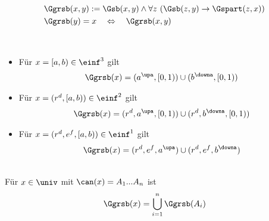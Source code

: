 
\begin{erin}
    \begin{align*}
        &\Ggrsb(x,y) := \Gsb(x,y) \wedge \forall z\ (\Gsb(z,y) \to \Gspart(z,x))\\
        &\Ggrsb(y) = x \quad \Leftrightarrow \quad \Ggrsb(x,y)
    \end{align*}
\end{erin}

\begin{hyp}\ 
    \begin{itemize}
        \item Für $x = [a,b) \in \einf^3$ gilt
            \begin{align*}
                \Ggrsb(x) = (a^\upa, [0,1)) \cup (b^\downa, [0,1))
            \end{align*}
        \item Für $x = (r^d,[a,b)) \in \einf^2$ gilt
            \begin{align*}
                \Ggrsb(x) = (r^d, a^\upa, [0,1)) \cup (r^d, b^\downa, [0,1))
            \end{align*}
        \item Für $x = (r^d,e^f,[a,b)) \in \einf^1$ gilt
            \begin{align*}
                \Ggrsb(x) = (r^d,e^f, a^\upa) \cup (r^d, e^f, b^\downa)
            \end{align*}
    \end{itemize}
\end{hyp}

\begin{hyp}\ \\
    Für $x \in \univ$ mit $\can(x) = A_1 ... A_n$ ist
    \begin{align*}
        \Ggrsb(x) = \bigcup_{i=1}^n \Ggrsb(A_i)
    \end{align*}
\end{hyp}




